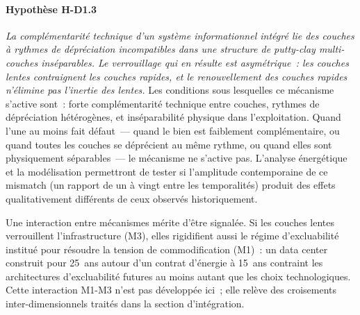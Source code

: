 \paragraph{Hypothèse H-D1.3} \emph{La complémentarité technique d'un système informationnel intégré lie des couches à rythmes de dépréciation incompatibles dans une structure de putty-clay multi-couches inséparables. Le verrouillage qui en résulte est asymétrique~: les couches lentes contraignent les couches rapides, et le renouvellement des couches rapides n'élimine pas l'inertie des lentes.} Les conditions sous lesquelles ce mécanisme s'active sont~: forte complémentarité technique entre couches, rythmes de dépréciation hétérogènes, et inséparabilité physique dans l'exploitation. Quand l'une au moins fait défaut~--- quand le bien est faiblement complémentaire, ou quand toutes les couches se déprécient au même rythme, ou quand elles sont physiquement séparables~--- le mécanisme ne s'active pas. L'analyse énergétique et la modélisation permettront de tester si l'amplitude contemporaine de ce mismatch (un rapport de un à vingt entre les temporalités) produit des effets qualitativement différents de ceux observés historiquement.

Une interaction entre mécanismes mérite d'être signalée. Si les couches lentes verrouillent l'infrastructure (M3), elles rigidifient aussi le régime d'excluabilité institué pour résoudre la tension de commodification (M1)~: un data center construit pour 25~ans autour d'un contrat d'énergie à 15~ans contraint les architectures d'excluabilité futures au moins autant que les choix technologiques. Cette interaction M1-M3 n'est pas développée ici~; elle relève des croisements inter-dimensionnels traités dans la section d'intégration.

